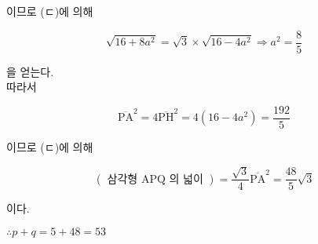\documentclass[10pt]{article}
\begin{document}
이므로 (ㄷ)에 의해

\[
\sqrt{16+8 a^{2}}=\sqrt{3} \times \sqrt{16-4 a^{2}} \Rightarrow a^{2}=\frac{8}{5}
\]

을 얻는다.\\
따라서

\[
\overline{\mathrm{PA}}^{2}=4 \overline{\mathrm{PH}}^{2}=4\left(16-4 a^{2}\right)=\frac{192}{5}
\]

이므로 (ㄷ)에 의해

\[
(\text { 삼각형 } \mathrm{APQ} \text { 의 넓이 })=\frac{\sqrt{3}}{4} \overline{\mathrm{PA}}^{2}=\frac{48}{5} \sqrt{3}
\]

이다.

\(\therefore p+q=5+48=53\)
\end{document}
